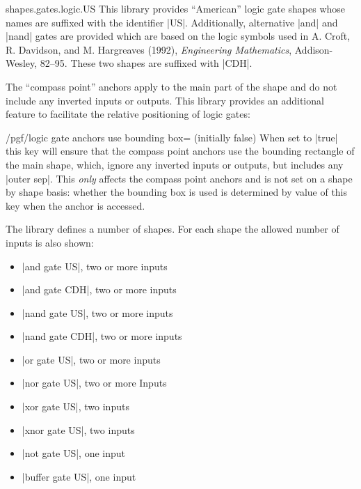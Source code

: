 \begin{pgflibrary}{shapes.gates.logic.US}
    This library provides ``American'' logic gate shapes whose names are
    suffixed with the identifier |US|. Additionally, alternative |and| and
    |nand| gates are provided which are based on the logic symbols used in A.
    Croft, R. Davidson, and M. Hargreaves (1992), \emph{Engineering
    Mathematics}, Addison-Wesley, 82--95. These two shapes are suffixed with
    |CDH|.

    The ``compass point'' anchors apply to the main part of the shape and do
    not include any inverted inputs or outputs. This library provides an
    additional feature to facilitate the relative positioning of logic gates:

    \begin{key}{/pgf/logic gate anchors use bounding box= (initially false)}
        When set to |true| this key will ensure that the compass point anchors
        use the bounding rectangle of the main shape, which, ignore any
        inverted inputs or outputs, but includes any |outer sep|. This
        \emph{only} affects the compass point anchors and is not set on a shape
        by shape basis: whether the bounding box is used is determined by value
        of this key when the anchor is accessed.
\begin{codeexample}[]
\end{codeexample}
    \end{key}

    The library defines a number of shapes. For each shape the allowed number
    of inputs is also shown:
    \begin{itemize}
        \item |and gate US|, two or more inputs
        \item |and gate CDH|, two or more inputs
        \item |nand gate US|, two or more inputs
        \item |nand gate CDH|, two or more inputs
        \item |or gate US|, two or more inputs
        \item |nor gate US|, two or more Inputs
        \item |xor gate US|, two inputs
        \item |xnor gate US|, two inputs
        \item |not gate US|, one input
        \item |buffer gate US|, one input
    \end{itemize}


\end{pgflibrary}
